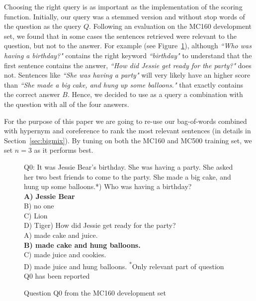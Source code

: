 \documentclass[11pt]{article}
\begin{document}
Choosing the right query is as important as the implementation of the scoring function.
Initially, our query was a stemmed version and without stop words of the question as the query $Q$.
Following an evaluation on the MC160 development set, we found that in some cases the sentences retrieved were relevant to the question, but not to the answer.
For example (see Figure~\ref{fig:mct_example}), although {\em ``Who was having a birthday?"} contains the right keyword {\em ``birthday"} to understand that the first sentence contains the answer, {\em ``How did Jessie get ready for the party?"} does not.
Sentences like {\em ``She was having a party"} will very likely have an higher score than {\em ``She made a big cake, and hung up some balloons."} that exactly contains the correct answer $B$.
Hence, we decided to use as a query a combination with the question with all of the four answers.

For the purpose of this paper we are going to re-use our bag-of-words combined with hypernym and coreference to rank the most relevant sentences (in details in Section~\ref{sec:bigmix}).
By tuning on both the {\small MC160} and {\small MC500} training set, we set $n=3$ as it performs best.

\begin{figure}[!th]
\begin{framed}
\begin{flushleft}
{\small Q0}: It was Jessie Bear's birthday. She was having a party.  She asked her two best friends to
come to the party.  She made a big cake, and hung up some balloons.*\newline{}) Who was having a birthday?\\
\textbf{A) Jessie Bear}\\
B) no one\\
C) Lion\\
D) Tiger\newline{}) How did Jessie get ready for the party?\\
A) made cake and juice.\\
\textbf{B) made cake and hung balloons.}\\
C) made juice and cookies.\\
D) made juice and hung balloons.\newline\newline
{\small  \textsuperscript{*}Only relevant part of question {\small Q0} has been reported}
\end{flushleft}
\end{framed}
\caption{\label{fig:mct_example} Question Q0 from the MC160 development set}
\end{figure}
\end{document}
